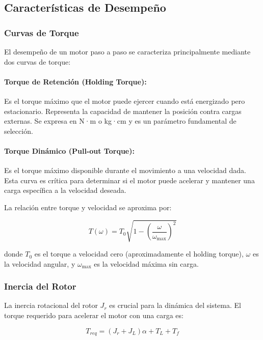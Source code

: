 \subsection{Características de Desempeño}

\subsubsection{Curvas de Torque}

El desempeño de un motor paso a paso se caracteriza principalmente mediante dos curvas de torque:

\paragraph{Torque de Retención (Holding Torque):}

Es el torque máximo que el motor puede ejercer cuando está energizado pero estacionario. Representa la capacidad de mantener la posición contra cargas externas. Se expresa en N·m o kg·cm y es un parámetro fundamental de selección.

\paragraph{Torque Dinámico (Pull-out Torque):}

Es el torque máximo disponible durante el movimiento a una velocidad dada. Esta curva es crítica para determinar si el motor puede acelerar y mantener una carga específica a la velocidad deseada.

La relación entre torque y velocidad se aproxima por:

\begin{equation}
T(\omega) = T_0 \sqrt{1 - \left(\frac{\omega}{\omega_{\max}}\right)^2}
\end{equation}

donde $T_0$ es el torque a velocidad cero (aproximadamente el holding torque), $\omega$ es la velocidad angular, y $\omega_{\max}$ es la velocidad máxima sin carga.

\subsubsection{Inercia del Rotor}

La inercia rotacional del rotor $J_r$ es crucial para la dinámica del sistema. El torque requerido para acelerar el motor con una carga es:

\begin{equation}
T_{req} = (J_r + J_L) \alpha + T_L + T_f
\end{equation}

